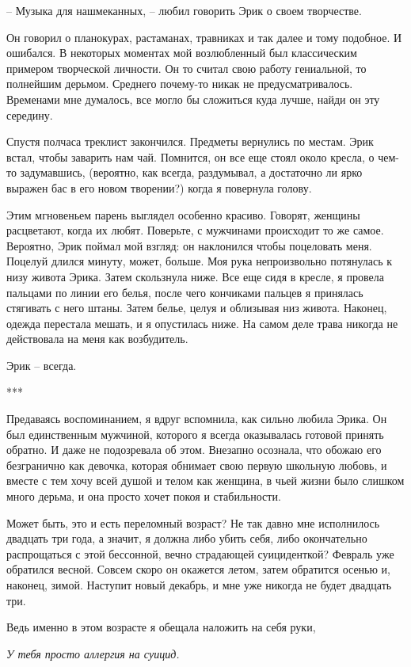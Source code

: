 \documentclass[
]{book}
\begin{document}
-- Музыка для нашмеканных, -- любил говорить Эрик о своем творчестве.

Он говорил о планокурах, растаманах, травниках и так далее и тому подобное. И ошибался. В некоторых моментах мой возлюбленный был классическим примером творческой личности. Он то считал свою работу гениальной, то полнейшим дерьмом. Среднего почему-то никак не предусматривалось. Временами мне думалось, все могло бы сложиться куда лучше, найди он эту середину.

Спустя полчаса треклист закончился. Предметы вернулись по местам. Эрик встал, чтобы заварить нам чай. Помнится, он все еще стоял около кресла, о чем-то задумавшись, (вероятно, как всегда, раздумывал, а достаточно ли ярко выражен бас в его новом творении?) когда я повернула голову.

Этим мгновеньем парень выглядел особенно красиво. Говорят, женщины расцветают, когда их любят. Поверьте, с мужчинами происходит то же самое. Вероятно, Эрик поймал мой взгляд: он наклонился чтобы поцеловать меня. Поцелуй длился минуту, может, больше. Моя рука непроизвольно потянулась к низу живота Эрика. Затем скользнула ниже. Все еще сидя в кресле, я провела пальцами по линии его белья, после чего кончиками пальцев я принялась стягивать с него штаны. Затем белье, целуя и облизывая низ живота. Наконец, одежда перестала мешать, и я опустилась ниже. На самом деле трава никогда не действовала на меня как возбудитель.

Эрик -- всегда.

***

Предаваясь воспоминанием, я вдруг вспомнила, как сильно любила Эрика. Он был единственным мужчиной, которого я всегда оказывалась готовой принять обратно. И даже не подозревала об этом. Внезапно осознала, что обожаю его безгранично как девочка, которая обнимает свою первую школьную любовь, и вместе с тем хочу всей душой и телом как женщина, в чьей жизни было слишком много дерьма, и она просто хочет покоя и стабильности.

Может быть, это и есть переломный возраст? Не так давно мне исполнилось двадцать три года, а значит, я должна либо убить себя, либо окончательно распрощаться с этой бессонной, вечно страдающей суициденткой? Февраль уже обратился весной. Совсем скоро он окажется летом, затем обратится осенью и, наконец, зимой. Наступит новый декабрь, и мне уже никогда не будет двадцать три.

Ведь именно в этом возрасте я обещала наложить на себя руки,

\emph{У тебя просто аллергия на суицид.}
\end{document}

